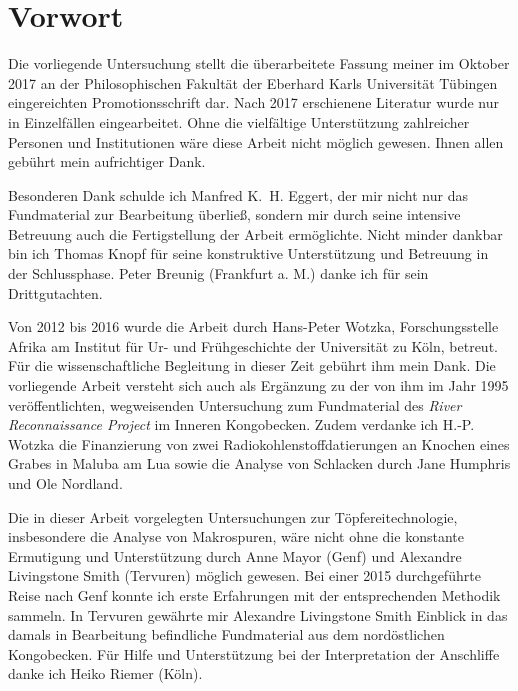 \cleardoublepage
\thispagestyle{empty}
\section*{Vorwort}
\begin{multicols}{2}
\raggedcolumns
\noindent Die vorliegende Untersuchung stellt die überarbeitete Fassung meiner im Oktober 2017 an der Philosophischen Fakultät der Eberhard Karls Universität Tübingen eingereichten Promotionsschrift dar. Nach 2017 erschienene Literatur wurde nur in Einzelfällen eingearbeitet. Ohne die vielfältige Unterstützung zahlreicher Personen und Institutionen wäre diese Arbeit nicht möglich gewesen. Ihnen allen gebührt mein aufrichtiger Dank.

Besonderen Dank schulde ich Manfred K.~H. Eggert, der mir nicht nur das Fundmaterial zur Bearbeitung überließ, sondern mir durch seine intensive Betreuung auch die Fertigstellung der Arbeit ermöglichte. Nicht minder dankbar bin ich Thomas Knopf für seine konstruktive Unterstützung und Betreuung in der Schlussphase. Peter Breunig (Frankfurt a. M.) danke ich für sein Drittgutachten.

Von 2012 bis 2016 wurde die Arbeit durch Hans-Peter Wotzka, Forschungsstelle Afrika am Institut für Ur- und Frühgeschichte der Universität zu Köln, betreut. Für die wissenschaftliche Begleitung in dieser Zeit gebührt ihm mein Dank. Die vorliegende Arbeit versteht sich auch als Ergänzung zu der von ihm im Jahr 1995 veröffentlichten, wegweisenden Untersuchung zum Fundmaterial des \textit{River Reconnaissance Project} im Inneren Kongobecken. Zudem verdanke ich H.-P. Wotzka die Finanzierung von zwei Radiokohlenstoffdatierungen an Knochen eines Grabes in Maluba am Lua sowie die Analyse von Schlacken durch Jane Humphris und Ole Nordland. 

Die in dieser Arbeit vorgelegten Untersuchungen zur Töpfereitechnologie, insbesondere die Analyse von Makrospuren, wäre nicht ohne die konstante Ermutigung und Unterstützung durch Anne Mayor (Genf) und \mbox{Alexandre} \mbox{Livingstone} Smith (Tervuren) möglich gewesen. Bei einer 2015 durchgeführte Reise nach Genf konnte ich erste Erfahrungen mit der entsprechenden Methodik sammeln. In Tervuren gewährte mir \mbox{Alexandre} Livingstone Smith Einblick in das damals in Bearbeitung befindliche Fundmaterial aus dem nordöstlichen Kongobecken. Für Hilfe und Unterstützung bei der Interpretation der Anschliffe danke ich Heiko Riemer (Köln).\columnbreak


\end{multicols}
